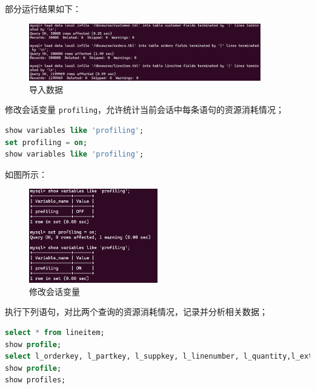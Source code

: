 \documentclass{article}
\renewcommand\tt{\texttt}
\begin{document}
部分运行结果如下：

\begin{figure}[H]
\centering
\includegraphics[width=0.9\textwidth]{img/11.png}
\caption{导入数据}
\end{figure}

修改会话变量 \tt{profiling}，允许统计当前会话中每条语句的资源消耗情况；

\begin{lstlisting}[language=sql]
show variables like 'profiling';
set profiling = on;
show variables like 'profiling';
\end{lstlisting}

如图所示：

\begin{figure}[H]
\centering
\includegraphics[width=0.5\textwidth]{img/12.png}
\caption{修改会话变量}
\end{figure}

执行下列语句，对比两个查询的资源消耗情况，记录并分析相关数据；

\begin{lstlisting}[language=sql]
select * from lineitem;
show profile;
select l_orderkey, l_partkey, l_suppkey, l_linenumber, l_quantity,l_extendedprice, l_discount, l_tax, l_returnflag, l_linestatus, l_shipdate, l_commitdate, l_receiptdate, l_shipinstruct, l_shipmode, l_comment from lineitem;
show profile;
show profiles;
\end{lstlisting}
\end{document}
